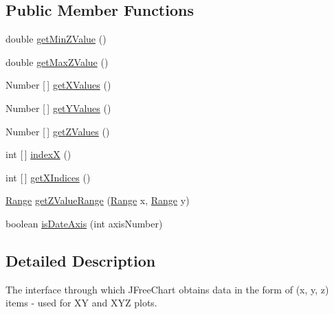 \subsection*{Public Member Functions}
\begin{DoxyCompactItemize}
\item 
double \mbox{\hyperlink{interfaceorg_1_1jfree_1_1data_1_1contour_1_1_contour_dataset_a27f848473fb6c0a89c91ea9101fe2698}{get\+Min\+Z\+Value}} ()
\item 
double \mbox{\hyperlink{interfaceorg_1_1jfree_1_1data_1_1contour_1_1_contour_dataset_a660230892a67782a7a63c9357121344b}{get\+Max\+Z\+Value}} ()
\item 
Number \mbox{[}$\,$\mbox{]} \mbox{\hyperlink{interfaceorg_1_1jfree_1_1data_1_1contour_1_1_contour_dataset_ad7a2140d12c0543a8178c8aafc4b3475}{get\+X\+Values}} ()
\item 
Number \mbox{[}$\,$\mbox{]} \mbox{\hyperlink{interfaceorg_1_1jfree_1_1data_1_1contour_1_1_contour_dataset_a0faf9e126a0ff7c38e59c2f56cec0ee9}{get\+Y\+Values}} ()
\item 
Number \mbox{[}$\,$\mbox{]} \mbox{\hyperlink{interfaceorg_1_1jfree_1_1data_1_1contour_1_1_contour_dataset_a57f811c962e8b83f203485a177f4361f}{get\+Z\+Values}} ()
\item 
int \mbox{[}$\,$\mbox{]} \mbox{\hyperlink{interfaceorg_1_1jfree_1_1data_1_1contour_1_1_contour_dataset_ae70cc41ec60ec5aea6aae21d9d868b1f}{indexX}} ()
\item 
int \mbox{[}$\,$\mbox{]} \mbox{\hyperlink{interfaceorg_1_1jfree_1_1data_1_1contour_1_1_contour_dataset_a7f341ba05202db3970ec479b1ef1a999}{get\+X\+Indices}} ()
\item 
\mbox{\hyperlink{classorg_1_1jfree_1_1data_1_1_range}{Range}} \mbox{\hyperlink{interfaceorg_1_1jfree_1_1data_1_1contour_1_1_contour_dataset_a3a85edeb7c32dc8188b1d4fe945bb542}{get\+Z\+Value\+Range}} (\mbox{\hyperlink{classorg_1_1jfree_1_1data_1_1_range}{Range}} x, \mbox{\hyperlink{classorg_1_1jfree_1_1data_1_1_range}{Range}} y)
\item 
boolean \mbox{\hyperlink{interfaceorg_1_1jfree_1_1data_1_1contour_1_1_contour_dataset_a0a10481379170b70de9a32d422cc6cd3}{is\+Date\+Axis}} (int axis\+Number)
\end{DoxyCompactItemize}


\subsection{Detailed Description}
The interface through which J\+Free\+Chart obtains data in the form of (x, y, z) items -\/ used for XY and X\+YZ plots.

